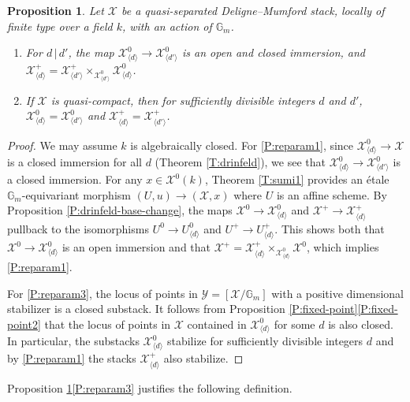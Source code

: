 \documentclass[a4paper]{amsart}
\theoremstyle{plain}
\newtheorem{proposition}[theorem]{Proposition}
\theoremstyle{definition}
\theoremstyle{remark}
\numberwithin{equation}{section}
\newcommand{\GG}{\mathbb{G}}
\newcommand\cX{\mathcal{X}}
\newcommand\cY{\mathcal{Y}}
\begin{document}
\begin{proposition} \label{P:reparam}
Let $\cX$ be a quasi-separated Deligne--Mumford stack, 
locally of finite type over a field $k$, with an action of $\GG_m$.
\begin{enumerate}
	\item  \label{P:reparam1}
	For $d \,| \, d'$, the map $\cX^0_{\langle d \rangle} \to \cX^0_{\langle d' \rangle}$ is an open and closed immersion, and $\cX^+_{\langle d \rangle} = \cX^+_{\langle d' \rangle} \times_{\cX^0_{\langle d' \rangle} } \cX^0_{\langle d \rangle}$.
	\item  \label{P:reparam3}
	If $\cX$ is quasi-compact, then for sufficiently divisible integers $d$ and $d'$, $\cX^0_{\langle d \rangle} = \cX^0_{\langle d' \rangle}$ and $\cX^+_{\langle d \rangle} = \cX^+_{\langle d' \rangle}$.
\end{enumerate}
\end{proposition}

\begin{proof} We may assume $k$ is algebraically closed.
For \eqref{P:reparam1}, since $\cX^0_{\langle d \rangle} \to \cX$ is a closed immersion for all $d$ (Theorem \ref{T:drinfeld}), we see that $\cX^0_{\langle d \rangle} \to \cX^0_{\langle d' \rangle}$ is a closed immersion.   For any $x \in \cX^0(k)$, Theorem \ref{T:sumi1} provides an \'etale $\GG_m$-equivariant morphism $(U, u) \to (\cX, x)$ where $U$ is an affine scheme.  By Proposition \ref{P:drinfeld-base-change}, the maps $\cX^0 \to \cX^0_{\langle d \rangle}$ and $\cX^+ \to \cX^+_{\langle d \rangle}$ pullback to the isomorphisms $U^0 \to U^0_{\langle d \rangle}$ and $U^+ \to U^+_{\langle d \rangle}$. This shows both that $\cX^0 \to \cX^0_{\langle d \rangle}$ is an open immersion and that $\cX^+ = \cX^+_{\langle d \rangle} \times_{\cX^0_{\langle d \rangle} } \cX^0$, which implies \eqref{P:reparam1}.



For \eqref{P:reparam3}, the locus of points in $\cY=[\cX/\GG_m]$ with a positive dimensional stabilizer is a closed substack.  It follows from Proposition \ref{P:fixed-point}\eqref{P:fixed-point2} that the locus of points in $\cX$ contained in $\cX^0_{\langle d \rangle}$ for some $d$ is also closed.  In particular, the substacks $\cX^0_{\langle d \rangle}$ stabilize for sufficiently divisible integers $d$ and by \eqref{P:reparam1} the stacks $\cX^+_{\langle d \rangle}$ also stabilize.
\end{proof}

Proposition \ref{P:reparam}\eqref{P:reparam3} justifies the following definition.
\end{document}
